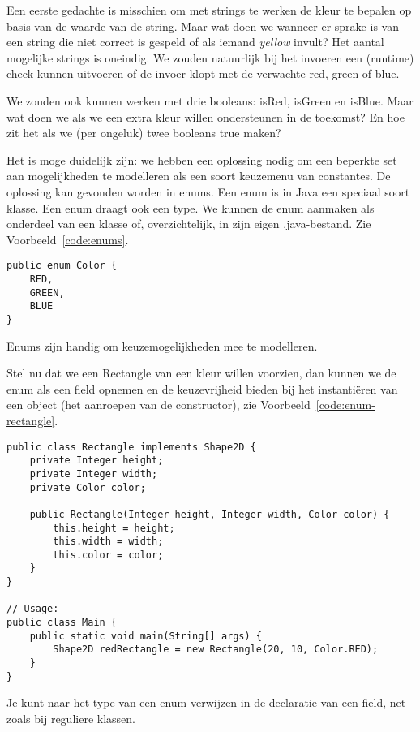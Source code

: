 Een eerste gedachte is misschien om met strings te werken de kleur te bepalen 
op basis van de waarde van de string. Maar wat doen we wanneer er sprake is van een
string die niet correct is gespeld of als iemand \textit{yellow} invult?
Het aantal mogelijke strings is oneindig. We zouden natuurlijk bij het invoeren 
een (runtime) check kunnen uitvoeren of de invoer klopt met de verwachte red, green of blue.

We zouden ook kunnen werken met drie booleans: isRed, isGreen en isBlue. 
Maar wat doen we als we een extra kleur willen ondersteunen in de toekomst?
En hoe zit het als we (per ongeluk) twee booleans true maken?

Het is moge duidelijk zijn: we hebben een oplossing nodig om een beperkte set
aan mogelijkheden te modelleren als een soort keuzemenu van constantes. 
De oplossing kan gevonden worden in enums. Een enum is in Java een speciaal soort 
klasse. Een enum draagt ook een type. 
We kunnen de enum aanmaken als onderdeel van een klasse of, overzichtelijk, in zijn eigen .java-bestand.
Zie Voorbeeld~\ref{code:enums}.

\begin{listing}[H]
\begin{verbatim}
public enum Color {
    RED,
    GREEN,
    BLUE
}
\end{verbatim}
\caption{Enums zijn handig om keuzemogelijkheden mee te modelleren.}
\label{code:enums}
\end{listing}

Stel nu dat we een Rectangle van een kleur willen voorzien, dan kunnen we 
de enum als een field opnemen en de keuzevrijheid bieden bij het instantiëren
van een object (het aanroepen van de constructor), zie Voorbeeld~\ref{code:enum-rectangle}.

\begin{listing}[H]
\begin{verbatim}
public class Rectangle implements Shape2D {
    private Integer height;
    private Integer width;
    private Color color;

    public Rectangle(Integer height, Integer width, Color color) {
        this.height = height;
        this.width = width;
        this.color = color;
    }
}

// Usage:
public class Main {
    public static void main(String[] args) {
        Shape2D redRectangle = new Rectangle(20, 10, Color.RED);
    }
}

\end{verbatim}
\caption{Je kunt naar het type van een enum verwijzen in de declaratie van een field, net zoals bij reguliere klassen.}
\label{code:enum-rectangle}
\end{listing}

